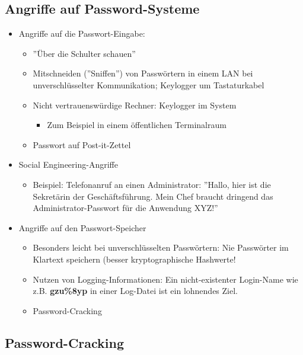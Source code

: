 \documentclass[openany]{book}
\begin{document}
\subsection{Angriffe auf Password-Systeme}

\begin{itemize}
    \item Angriffe auf die Passwort-Eingabe:
    \begin{itemize}
        \item ''Über die Schulter schauen''
        \item Mitschneiden (''Sniffen'') von Passwörtern in einem LAN bei unverschlüsselter Kommunikation; Keylogger um Tastaturkabel
        \item Nicht vertrauenswürdige Rechner: Keylogger im System
        \begin{itemize}
            \item Zum Beispiel in einem öffentlichen Terminalraum
        \end{itemize}
        \item Passwort auf Post-it-Zettel
    \end{itemize}
    \item Social Engineering-Angriffe
    \begin{itemize}
        \item Beispiel: Telefonanruf an einen Administrator: ''Hallo, hier ist die Sekretärin der Geschäftsführung. Mein Chef braucht dringend das Administrator-Passwort für die Anwendung XYZ!''
    \end{itemize}
    \item Angriffe auf den Passwort-Speicher
    \begin{itemize}
        \item Besonders leicht bei unverschlüsselten Passwörtern: Nie Passwörter im Klartext speichern (besser kryptographische Hashwerte!
        \item Nutzen von Logging-Informationen: Ein nicht-existenter Login-Name wie z.B. \textbf{gzu\%8yp} in einer Log-Datei ist ein lohnendes Ziel.
        \item Password-Cracking
    \end{itemize}
\end{itemize}

\subsection{Password-Cracking}
\end{document}
